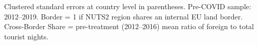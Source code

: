 \begin{table}[htbp]
   \par \raggedright 
   Clustered standard errors at country level in parentheses.
          Pre-COVID sample: 2012--2019. Border = 1 if NUTS2 region shares an
          internal EU land border. Cross-Border Share = pre-treatment (2012--2016)
          mean ratio of foreign to total tourist nights.
\end{table}


